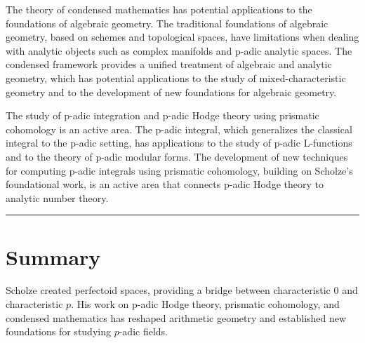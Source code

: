 The theory of condensed mathematics has potential applications to the foundations of algebraic geometry. The traditional foundations of algebraic geometry, based on schemes and topological spaces, have limitations when dealing with analytic objects such as complex manifolds and p-adic analytic spaces. The condensed framework provides a unified treatment of algebraic and analytic geometry, which has potential applications to the study of mixed-characteristic geometry and to the development of new foundations for algebraic geometry.

The study of p-adic integration and p-adic Hodge theory using prismatic cohomology is an active area. The p-adic integral, which generalizes the classical integral to the p-adic setting, has applications to the study of p-adic L-functions and to the theory of p-adic modular forms. The development of new techniques for computing p-adic integrals using prismatic cohomology, building on Scholze's foundational work, is an active area that connects p-adic Hodge theory to analytic number theory.

\begin{center}\rule{0.5\linewidth}{0.5pt}\end{center}

\section*{Summary}

Scholze created perfectoid spaces, providing a bridge between characteristic 0 and characteristic $p$. His work on p-adic Hodge theory, prismatic cohomology, and condensed mathematics has reshaped arithmetic geometry and established new foundations for studying $p$-adic fields.

